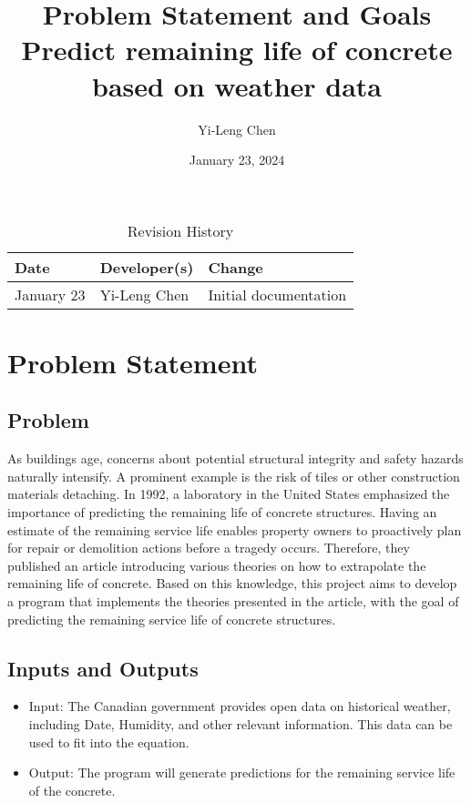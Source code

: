 \documentclass{article}
\title{Problem Statement and Goals \\
Predict remaining life of concrete based on weather data\\\progname}
\author{Yi-Leng Chen}
\date{January 23, 2024}
\begin{document}
\maketitle

\begin{table}[hp]
\caption{Revision History} \label{TblRevisionHistory}
\begin{tabularx}{\textwidth}{llX}
\toprule
\textbf{Date} & \textbf{Developer(s)} & \textbf{Change}\\
\midrule
January 23 & Yi-Leng Chen & Initial documentation\\
\bottomrule
\end{tabularx}
\end{table}

\section{Problem Statement}

\subsection{Problem}
As buildings age, concerns about potential structural integrity and safety hazards naturally intensify. A prominent example is the risk of tiles or other construction materials detaching. In 1992, a laboratory in the United States emphasized the importance of predicting the remaining life of concrete structures. Having an estimate of the remaining service life enables property owners to proactively plan for repair or demolition actions before a tragedy occurs. Therefore, they published an article introducing various theories on how to extrapolate the remaining life of concrete. Based on this knowledge, this project aims to develop a program that implements the theories presented in the article, with the goal of predicting the remaining service life of concrete structures.

\subsection{Inputs and Outputs}

\begin{itemize}
    \item Input: The Canadian government provides open data on historical weather, including Date, Humidity, and other relevant information. This data can be used to fit into the equation.
    \item Output: The program will generate predictions for the remaining service life of the concrete.
\end{itemize}
\end{document}
